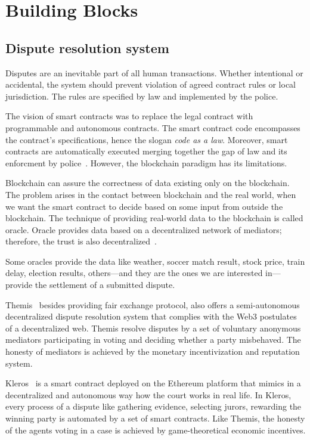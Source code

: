 \documentclass{ieeeaccess}
\begin{document}
\section{Building Blocks}\label{sec:building-blocks}
\subsection{Dispute resolution system}

Disputes are an inevitable part of all human transactions. Whether intentional or accidental, the system should prevent violation of agreed contract rules or local jurisdiction. The rules are specified by law and implemented by the police.

The vision of smart contracts was to replace the legal contract with
programmable and autonomous contracts. The smart contract code encompasses the contract's specifications, hence the slogan \textit{code as a law}. Moreover, smart contracts are automatically executed merging together the gap of law and its enforcment by police~\cite{allenGovernanceBlockchainDispute2019}. However, the blockchain paradigm has its limitations. 
 
Blockchain can assure the correctness of data existing only on the blockchain. The problem arises in the contact between blockchain and the real world, when we want the smart contract to decide based on some input from outside the blockchain. The technique of providing real-world data to the blockchain is called oracle. Oracle provides data based on a decentralized network of mediators; therefore, the trust is also decentralized~\cite{breidenbachChainlinkNextSteps2021}.

Some oracles provide the data like weather, soccer match result, stock
price, train delay, election results, others—and they are the ones we
are interested in—provide the settlement of a submitted dispute.

Themis~\cite{mengThemisDecentralizedEscrow2019} besides providing fair exchange protocol,
also offers a semi-autonomous decentralized dispute resolution system that complies with the Web3 postulates of a decentralized web. Themis
resolve disputes by a set of voluntary anonymous mediators participating
in voting and deciding whether a party misbehaved. The honesty of
mediators is achieved by the monetary incentivization and reputation
system.

Kleros~\cite{bergollaKlerosSociolegalCase2022} is a smart contract deployed on the Ethereum platform that mimics in a decentralized and autonomous way how the court works in real life. In Kleros, every process of a dispute like gathering evidence, selecting jurors, rewarding the winning party is automated by a set of smart contracts. Like Themis, the honesty of the agents voting in a case is achieved by game-theoretical economic incentives.
\end{document}
